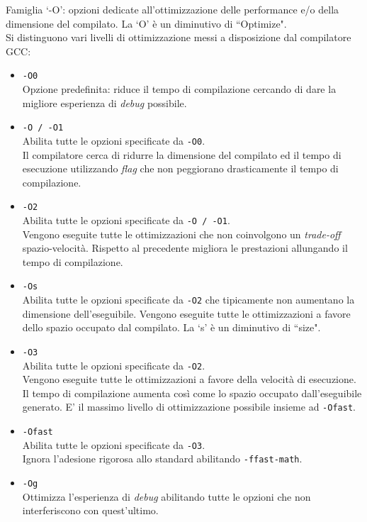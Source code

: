 Famiglia `-O': opzioni dedicate all'ottimizzazione delle performance e/o della 
dimensione del compilato. La `O' è un diminutivo di ``Optimize".\\
Si distinguono vari livelli di ottimizzazione messi a disposizione dal 
compilatore GCC:
\begin{itemize}
\item \verb|-O0|\\
Opzione predefinita: riduce il tempo di compilazione cercando di dare la 
migliore esperienza di \emph{debug} possibile.
\item \verb|-O / -O1|\\
Abilita tutte le opzioni specificate da \verb|-O0|.\\
Il compilatore cerca di ridurre la dimensione del compilato ed il tempo di 
esecuzione utilizzando \emph{flag} che non peggiorano drasticamente il tempo 
di compilazione.
\item \verb|-O2|\\
Abilita tutte le opzioni specificate da \verb|-O / -O1|.\\
Vengono eseguite tutte le ottimizzazioni che non coinvolgono un 
\emph{trade-off} spazio-velocità. Rispetto al precedente migliora le 
prestazioni allungando il tempo di compilazione.
\item \verb|-Os|\\
Abilita tutte le opzioni specificate da \verb|-O2| che tipicamente non 
aumentano la dimensione dell'eseguibile. Vengono eseguite tutte le 
ottimizzazioni a favore dello spazio occupato dal compilato. La `s' è un 
diminutivo di ``size".
\item \verb|-O3|\\
Abilita tutte le opzioni specificate da \verb|-O2|.\\
Vengono eseguite tutte le ottimizzazioni a favore della velocità di esecuzione. 
Il tempo di compilazione aumenta così come lo spazio occupato dall'eseguibile 
generato. E' il massimo livello di ottimizzazione possibile insieme ad 
\verb|-Ofast|.
\item \verb|-Ofast|\\
Abilita tutte le opzioni specificate da \verb|-O3|.\\
Ignora l'adesione rigorosa allo standard abilitando \verb|-ffast-math|.
\item \verb|-Og|\\
Ottimizza l'esperienza di \emph{debug} abilitando tutte le opzioni che non 
interferiscono con quest'ultimo.
\end{itemize}

